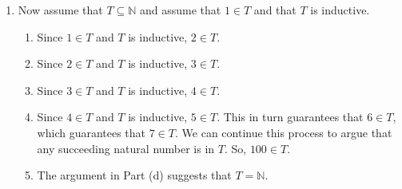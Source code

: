 \documentclass[11pt]{article}
\begin{document}
\begin{enumerate}
\item Now assume that  $T \subseteq \mathbb{N}$ and assume that  $1 \in T$ and that  $T$ is inductive.
\begin{enumerate}
\item Since $1 \in T$ and $T$ is inductive,   $2 \in T$.

\item Since $2 \in T$ and $T$ is inductive,  $3 \in T$.

\item Since $3 \in T$ and $T$ is inductive,   $4 \in T$.

\item Since $4 \in T$ and $T$ is inductive, $5 \in T$.  This in turn guarantees that  $6 \in T$, which guarantees that  $7 \in T$.  We can continue this process to argue that any succeeding natural number is in  $T$.  So, $100 \in T$.

\item The argument in Part (d) suggests that  $T = \mathbb{N}$.

\end{enumerate}
\end{enumerate}
\hbreak
\end{document}
